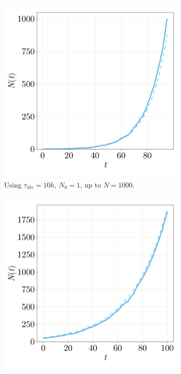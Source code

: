 \begin{figure}[ht]
    \centering
    \begin{subfigure}{0.4\textwidth}
        \centering
        \includegraphics[width=\textwidth]{figures/403/403-growth-prolif.png}
        \caption{Using $\tau_\text{div}=10h$, $N_0=1$, up to $N=1000$.}
    \end{subfigure}
    \hspace{4em}
    \begin{subfigure}{0.4\textwidth}
        \centering
        \includegraphics[width=\textwidth]{figures/403/403-growth-diff.png}

\end{subfigure}
\end{figure}

